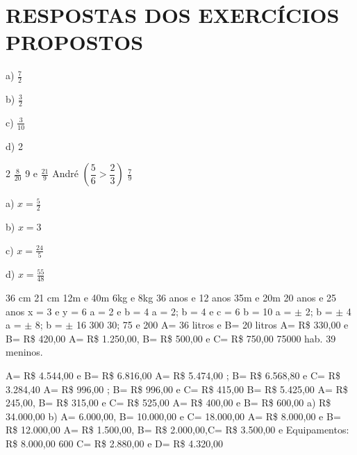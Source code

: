 \section{RESPOSTAS DOS EXERCÍCIOS PROPOSTOS}

\begin{respostas}{2}
	\ansitem{}
	\begin{multicols}{4}
		a) $\frac{7}{2}$

		b) $\frac{3}{2}$

		c) $\frac{3}{10}$
		
		d) 2
	\end{multicols}
	\ansitem{} 2
	\ansitem{} $\frac{8}{20}$
	\ansitem{} 9 e $\frac{21}{9}$
	\ansitem{} André $\left(\dfrac{5}{6} > \dfrac{2}{3}\right)$
	\ansitem{} $\frac{7}{9}$
\end{respostas}

\begin{respostas}{3}
	\ansitem{}\begin{multicols}{4}
		a) $x = \frac{5}{2}$

		b) $x = 3$

		c) $x = \frac{24}{5}$	
		
		d) $x = \frac{55}{48}$
	\end{multicols}
	\ansitem{} 36 cm
	\ansitem{} 21 cm
	\ansitem{} 12m e 40m
    \ansitem{} 6kg e 8kg
    \ansitem{} 36 anos e 12 anos
    \ansitem{} 35m e 20m
    \ansitem{} 20 anos e 25 anos
    \ansitem{} x = 3  e y = 6
    \ansitem{} a = 2  e b = 4
    \ansitem{} a = 2;  b = 4  e  c = 6
    \ansitem{} b = 10
    \ansitem{} a = $\pm$ 2; b = $\pm$ 4 
    \ansitem{} a = $\pm$ 8; b = $\pm$ 16
    \ansitem{} 300
    \ansitem{} 30; 75 e 200
	\ansitem{} A= 36 litros e B= 20 litros
	\ansitem{} A= R\$ 330,00 e B= R\$ 420,00      
	\ansitem{} A= R\$ 1.250,00, B= R\$ 500,00 e C= R\$ 750,00
	\ansitem{} 75000 hab.
	\ansitem{} 39 meninos.
\end{respostas}

\begin{respostas}{4}
\ansitem{} A= R\$ 4.544,00  e B= R\$ 6.816,00
\ansitem{} A= R\$ 5.474,00 ;  B= R\$ 6.568,80 e C= R\$ 3.284,40
\ansitem{} A= R\$ 996,00 ;  B= R\$ 996,00 e C= R\$ 415,00
\ansitem{} B= R\$ 5.425,00
\ansitem{} A= R\$ 245,00, B= R\$ 315,00 e C= R\$ 525,00
\ansitem{} A= R\$ 400,00 e B= R\$ 600,00
\ansitem{}  
a) R\$ 34.000,00
b) A= 6.000,00, B= 10.000,00 e C= 18.000,00 
\ansitem{} A= R\$  8.000,00 e B= R\$ 12.000,00
\ansitem{} A= R\$ 1.500,00, B= R\$ 2.000,00,C= R\$ 3.500,00 e Equipamentos: R\$ 8.000,00
\ansitem{} 600		
\ansitem{} C= R\$ 2.880,00 e D= R\$ 4.320,00
\end{respostas}

